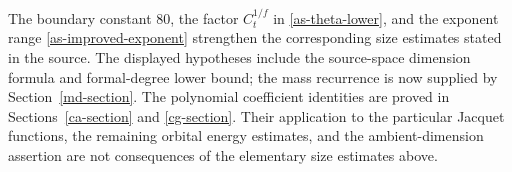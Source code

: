 The boundary constant $80$, the factor $C_t^{1/f}$ in
\eqref{as-theta-lower}, and the exponent range
\eqref{as-improved-exponent} strengthen the corresponding
size estimates stated in the source.  The displayed hypotheses
include the source-space dimension formula and formal-degree lower
bound; the mass recurrence is now supplied by Section~\ref{md-section}.
The polynomial coefficient identities are proved in
Sections~\ref{ca-section} and \ref{cg-section}. Their application to
the particular Jacquet functions, the remaining orbital energy
estimates, and the ambient-dimension assertion are not consequences
of the elementary size estimates above.


